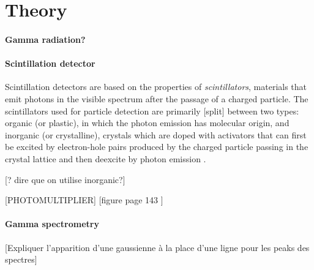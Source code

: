 \section{Theory}
\paragraph{Gamma radiation?}

\paragraph{Scintillation detector}
Scintillation detectors are based on the properties of \emph{scintillators}, 
materials that emit photons in the visible spectrum after the passage of a charged particle.
The scintillators used for particle detection are primarily [split] between two types: 
organic (or plastic), in which the photon emission has molecular origin, 
and inorganic (or crystalline), crystals which are doped with activators that can first be excited by electron-hole pairs 
produced by the charged particle passing in the crystal lattice and then deexcite by photon emission \cite{intro_nuclear_particle_physics}.

[? dire que on utilise inorganic?]

[PHOTOMULTIPLIER] [figure page 143 \cite{intro_nuclear_particle_physics}]

\paragraph{Gamma spectrometry}
[Expliquer l'apparition d'une gaussienne à la place d'une ligne pour les peaks des spectres]
